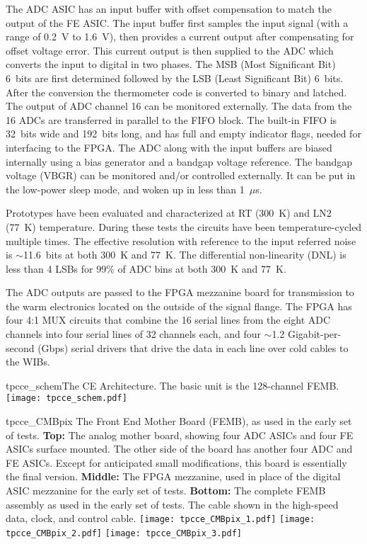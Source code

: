 The ADC ASIC has an input buffer with offset compensation to match the output of the FE ASIC.
The input buffer first samples the input signal (with a range of 0.2~V to 1.6~V),
then provides a current output after compensating for offset voltage error.
This current output is then supplied to the ADC which converts the input to digital in two phases.
The MSB (Most Significant Bit) 6~bits are first determined followed by the LSB (Least Significant Bit) 6~bits.
After the conversion the thermometer code is converted to binary and latched.
The output of ADC channel 16 can be monitored externally.
The data from the 16 ADCs are transferred in parallel to the FIFO block.
The built-in FIFO is 32~bits wide and 192~bits long,
and has full and empty indicator flags, needed for interfacing to the FPGA.
The ADC along with the input buffers are biased internally using a bias generator and a bandgap voltage reference.
The bandgap voltage (VBGR) can be monitored and/or controlled externally.
It can be put in the low-power sleep mode, and woken up in less than 1~$\mu$s.

Prototypes have been evaluated and characterized at RT (300~K) and LN2 (77~K) temperature.
During these tests the circuits have been temperature-cycled multiple times.
The effective resolution with reference to the input referred noise is $\sim$11.6~bits at both 300~K and 77~K.
The differential non-linearity (DNL) is less than 4 LSBs for 99\% of ADC bins at both 300~K and 77~K.

 
 
 The ADC outputs are passed to the FPGA mezzanine board for transmission to the warm electronics
 located on the outside of the signal flange.
The FPGA has four 4:1 MUX circuits that combine the 16 serial lines from the eight ADC
channels into four serial lines of 32 channels each, and 
four $\sim$1.2 Gigabit-per-second (Gbps) serial drivers that drive the data in each
line over cold cables to the WIBs.

\begin{cdrfigure}{tpcce_schem}{The CE Architecture. The basic unit is the 128-channel FEMB.}
\texttt{[image: tpcce\_schem.pdf]}
\end{cdrfigure}

\begin{cdrfigure}{tpcce_CMBpix}
{The Front End Mother Board (FEMB), as used in the early set of tests.
  {\bf Top:} The analog mother board, showing four ADC ASICs and four FE ASICs surface mounted.
  The other side of the board has another four ADC and FE ASICs.
  Except for anticipated small modifications, this board is essentially the final version.
  {\bf Middle:} The FPGA mezzanine, used in place of the digital ASIC mezzanine for the early set of tests.
  {\bf Bottom:} The complete FEMB assembly as used in the early set of tests.
  The cable shown in the high-speed data, clock, and control cable.}
\texttt{[image: tpcce\_CMBpix\_1.pdf]}
\texttt{[image: tpcce\_CMBpix\_2.pdf]}
\texttt{[image: tpcce\_CMBpix\_3.pdf]}
\end{cdrfigure}

